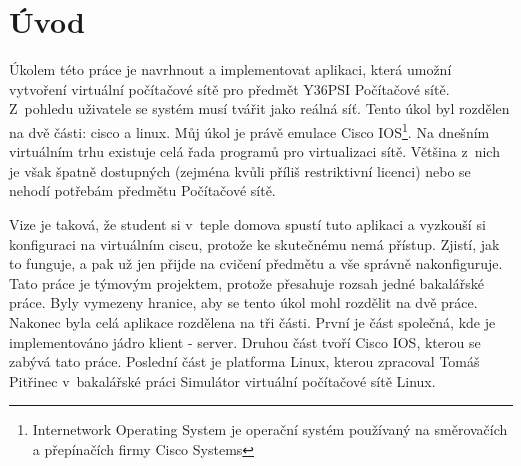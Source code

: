 \chapter{Úvod} \label{uvod}


Úkolem této práce je navrhnout a implementovat aplikaci, která umožní vytvoření virtuální počítačové sítě pro předmět Y36PSI Počítačové sítě. Z~pohledu uživatele se systém musí tvářit jako reálná síť. Tento úkol byl rozdělen na dvě části: cisco a linux. Můj úkol je právě emulace Cisco IOS\footnote{Internetwork Operating System je operační systém používaný na směrovačích a přepínačích firmy Cisco Systems}. Na dnešním virtuálním trhu existuje celá řada programů pro virtualizaci sítě. Většina z~nich je však špatně dostupných (zejména kvůli příliš restriktivní licenci) nebo se nehodí potřebám předmětu Počítačové sítě. 

Vize je taková, že student si v~teple domova spustí tuto aplikaci a vyzkouší si konfiguraci na virtuálním ciscu, protože ke skutečnému nemá přístup. Zjistí, jak to funguje, a pak už jen přijde na cvičení předmětu a vše správně nakonfiguruje.
Tato práce je týmovým projektem, protože přesahuje rozsah jedné bakalářské práce. Byly vymezeny hranice, aby se tento úkol mohl rozdělit na dvě práce. Nakonec byla celá aplikace rozdělena na tři části. První je část společná, kde je implementováno jádro klient - server. Druhou část tvoří Cisco IOS, kterou se zabývá tato práce. Poslední část je platforma Linux, kterou zpracoval Tomáš Pitřinec v~bakalářské práci Simulátor virtuální počítačové sítě Linux.


